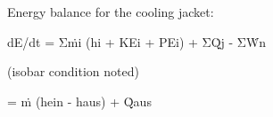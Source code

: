 Energy balance for the cooling jacket:  

dE/dt = Σṁi (hi + KEi + PEi) + ΣQ̇j - ΣẆn  

(isobar condition noted)  

= ṁ (hein - haus) + Q̇aus